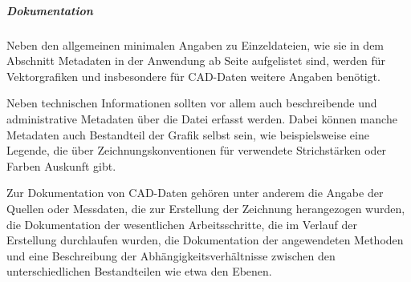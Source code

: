 \subparagraph{Dokumentation}
Neben den allgemeinen minimalen Angaben zu Einzeldateien, wie sie in dem Abschnitt Metadaten in der Anwendung ab Seite \pageref{Metadaten-anwendung} aufgelistet sind, werden für Vektorgrafiken und insbesondere für CAD-Daten weitere Angaben benötigt.

Neben technischen Informationen sollten vor allem auch beschreibende und administrative Metadaten über die Datei erfasst werden. Dabei können manche Metadaten auch Bestandteil der Grafik selbst sein, wie beispielsweise eine Legende, die über Zeichnungskonventionen für verwendete Strichstärken oder Farben Auskunft gibt.

Zur Dokumentation von CAD-Daten gehören unter anderem die Angabe der Quellen oder Messdaten, die zur Erstellung der Zeichnung herangezogen wurden, die Dokumentation der wesentlichen Arbeitsschritte, die im Verlauf der Erstellung durchlaufen wurden, die Dokumentation der angewendeten Methoden und eine Beschreibung der Abhängigkeitsverhältnisse zwischen den unterschiedlichen Bestandteilen wie etwa den Ebenen.

